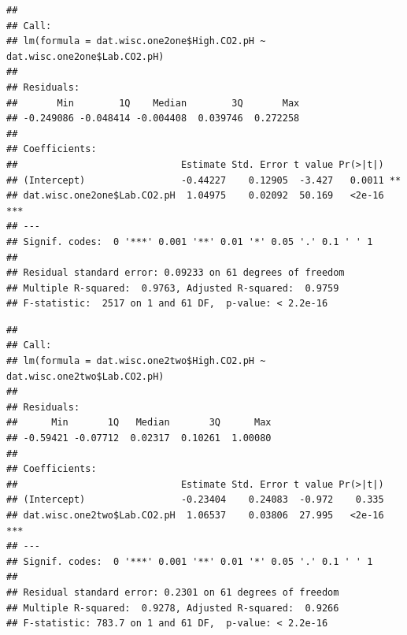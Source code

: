 \documentclass[]{article}
\newenvironment{Shaded}{\begin{snugshade}}{\end{snugshade}}
\newcommand{\KeywordTok}[1]{\textcolor[rgb]{0.13,0.29,0.53}{\textbf{#1}}}
\newcommand{\NormalTok}[1]{#1}
\newcommand{\OperatorTok}[1]{\textcolor[rgb]{0.81,0.36,0.00}{\textbf{#1}}}
\newcommand{\StringTok}[1]{\textcolor[rgb]{0.31,0.60,0.02}{#1}}
\begin{document}
\begin{verbatim}
## 
## Call:
## lm(formula = dat.wisc.one2one$High.CO2.pH ~ dat.wisc.one2one$Lab.CO2.pH)
## 
## Residuals:
##       Min        1Q    Median        3Q       Max 
## -0.249086 -0.048414 -0.004408  0.039746  0.272258 
## 
## Coefficients:
##                             Estimate Std. Error t value Pr(>|t|)    
## (Intercept)                 -0.44227    0.12905  -3.427   0.0011 ** 
## dat.wisc.one2one$Lab.CO2.pH  1.04975    0.02092  50.169   <2e-16 ***
## ---
## Signif. codes:  0 '***' 0.001 '**' 0.01 '*' 0.05 '.' 0.1 ' ' 1
## 
## Residual standard error: 0.09233 on 61 degrees of freedom
## Multiple R-squared:  0.9763, Adjusted R-squared:  0.9759 
## F-statistic:  2517 on 1 and 61 DF,  p-value: < 2.2e-16
\end{verbatim}

\begin{Shaded}
\end{Shaded}

\begin{verbatim}
## 
## Call:
## lm(formula = dat.wisc.one2two$High.CO2.pH ~ dat.wisc.one2two$Lab.CO2.pH)
## 
## Residuals:
##      Min       1Q   Median       3Q      Max 
## -0.59421 -0.07712  0.02317  0.10261  1.00080 
## 
## Coefficients:
##                             Estimate Std. Error t value Pr(>|t|)    
## (Intercept)                 -0.23404    0.24083  -0.972    0.335    
## dat.wisc.one2two$Lab.CO2.pH  1.06537    0.03806  27.995   <2e-16 ***
## ---
## Signif. codes:  0 '***' 0.001 '**' 0.01 '*' 0.05 '.' 0.1 ' ' 1
## 
## Residual standard error: 0.2301 on 61 degrees of freedom
## Multiple R-squared:  0.9278, Adjusted R-squared:  0.9266 
## F-statistic: 783.7 on 1 and 61 DF,  p-value: < 2.2e-16
\end{verbatim}

\begin{Shaded}
\end{Shaded}
\end{document}
